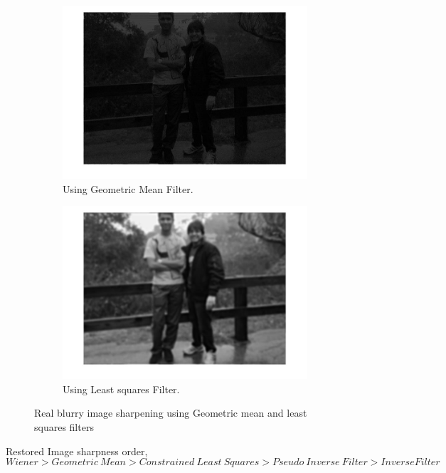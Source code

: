 \begin{figure}[H]
        \centering
        \begin{subfigure}[b]{0.49\textwidth}
                \centering
                \includegraphics[width=\textwidth]{geo_mean.jpg}
                \caption{Using Geometric Mean Filter.}
        \end{subfigure}
        \begin{subfigure}[b]{0.49\textwidth}
                 \centering
                 \includegraphics[width=\textwidth]{least_squares.jpg}
                 \caption{Using Least squares Filter.}
                 \label{fig:friends}
                       
        \end{subfigure}             
        \caption{Real blurry image sharpening using Geometric mean and least squares filters}
\end{figure}

Restored Image sharpness order,
\begin{equation*}
Wiener > Geometric~Mean > Constrained~Least~Squares > Pseudo~Inverse~Filter > Inverse Filter
\end{equation*}
\newpage